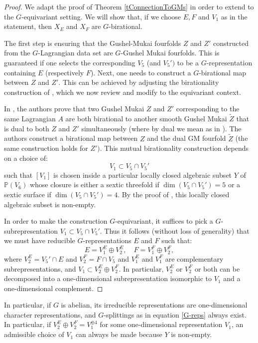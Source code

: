 \documentclass[11pt]{amsart}
\theoremstyle{plain}
\numberwithin{equation}{section}
\theoremstyle{definition}
\theoremstyle{remark}
\newcommand{\bP}{\mathbb{P}}
\begin{document}
\begin{proof}
We adapt the proof of Theorem \ref{tConnectionToGMs} in order to extend to the $G$-equivariant setting. We will show that, if we choose $E,F$ and $V_1$ as in the statement, then $X_E$ and $X_F$ are $G$-birational.

The first step is ensuring that the Gushel-Mukai fourfolds $Z$ and $Z'$ constructed from the $G$-Lagrangian data set are $G$-Gushel Mukai fourfolds. 
This is guaranteed if one selects the corresponding $V_5$ (and $V_5')$ to be a $G$-representation containing $E$ (respectively $F$).
Next, one needs to construct a $G$-birational map between $Z$ and $Z'$. This can be achieved by adjusting the birationality construction of \cite[Section 4.5-4.6]{DK1}, which we now review and modify to the equivariant context.

In \cite{DK1}, the authors prove that two Gushel Mukai $Z$ and $Z'$ corresponding to the same Lagrangian $A$ are both birational to another smooth Gushel Mukai $\widetilde{Z}$ that is dual to both $Z$ and $Z'$ simultaneously (where by dual we mean as in \cite[Definition 3.26]{DK1}).
The authors construct a birational map between $Z$ and the dual GM fourfold $\widetilde{Z}$ (the same construction holds for $Z')$. This mutual birationality construction depends on a choice of:
$$V_1\subset V_5\cap V_5'$$ 
such that $[V_1]$ is chosen inside a particular locally closed algebraic subset $Y$ of $\bP(V_6)$ whose closure is either  a sextic threefold if $\dim (V_5\cap V_5')=5$ or a sextic surface if $\dim (V_5\cap V_5')=4$.
By the proof of  \cite[Theorem 4.15]{DK1}, this locally closed algebraic subset is non-empty.

In order to make the construction $G$-equivariant, it suffices to pick a $G$-subrepresentation $V_1\subset V_5\cap V_5'$. Thus it follows (without loss of generality) that we must have reducible $G$-representations $E$ and $F$ such that:
\begin{equation}\label{G-reps}
    E=V_1^E \oplus V_2^E, \quad F=V_1^F\oplus V_2^F,
\end{equation} where $V_2^E = V_5'\cap E$ and $V_2^F= F \cap V_5$ and $V_1^E$ and $V_1^F$ are complementary subrepresentations, and $V_1 \subset V_2^E \oplus V_2^F$. In particular, $V_2^E$ or $V_2^F$ or both can be decomposed into a one-dimensional subrepresentation isomorphic to $V_1$ and a one-dimensional complement. 
\end{proof}



    In particular, if $G$ is abelian, its irreducible representations are one-dimensional character representations, and $G$-splittings as in equation \ref{G-reps} always exist. In particular, if $V_2^E \oplus V_2^F = V_1^{\oplus 4}$ for some one-dimensional representation $V_1$, an admissible choice of $V_1$ can always be made because $Y$ is non-empty. 
\end{document}
